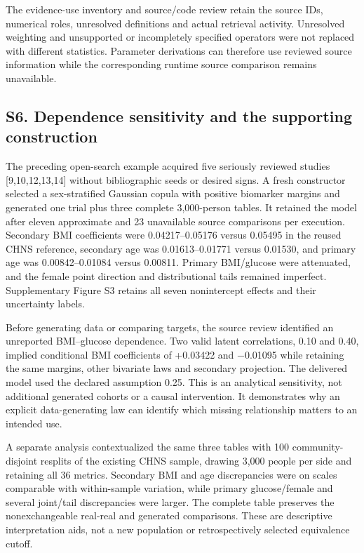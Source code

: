 \documentclass[11pt,letterpaper]{article}
\begin{document}
\endgroup

The evidence-use inventory and source/\allowbreak{}code review retain the source IDs, numerical roles, unresolved definitions and actual retrieval activity. Unresolved weighting and unsupported or incompletely specified operators were not replaced with different statistics. Parameter derivations can therefore use reviewed source information while the corresponding runtime source comparison remains unavailable.


\clearpage

\subsection*{S6. Dependence sensitivity and the supporting construction}

The preceding open-search example acquired five seriously reviewed studies [9,10,12,13,14] without bibliographic seeds or desired signs. A fresh constructor selected a sex-stratified Gaussian copula with positive biomarker margins and generated one trial plus three complete 3,000-person tables. It retained the model after eleven approximate and 23 unavailable source comparisons per execution. Secondary BMI coefficients were 0.04217–\allowbreak{}0.05176 versus 0.05495 in the reused CHNS reference, secondary age was 0.01613–\allowbreak{}0.01771 versus 0.01530, and primary age was 0.00842–\allowbreak{}0.01084 versus 0.00811. Primary BMI/\allowbreak{}glucose were attenuated, and the female point direction and distributional tails remained imperfect. Supplementary Figure S3 retains all seven nonintercept effects and their uncertainty labels.


Before generating data or comparing targets, the source review identified an unreported BMI–\allowbreak{}glucose dependence. Two valid latent correlations, 0.10 and 0.40, implied conditional BMI coefficients of +0.03422 and −0.01095 while retaining the same margins, other bivariate laws and secondary projection. The delivered model used the declared assumption 0.25. This is an analytical sensitivity, not additional generated cohorts or a causal intervention. It demonstrates why an explicit data-generating law can identify which missing relationship matters to an intended use.


A separate analysis contextualized the same three tables with 100 community-disjoint resplits of the existing CHNS sample, drawing 3,000 people per side and retaining all 36 metrics. Secondary BMI and age discrepancies were on scales comparable with within-sample variation, while primary glucose/\allowbreak{}female and several joint/\allowbreak{}tail discrepancies were larger. The complete table preserves the nonexchangeable real-real and generated comparisons. These are descriptive interpretation aids, not a new population or retrospectively selected equivalence cutoff.
\end{document}
